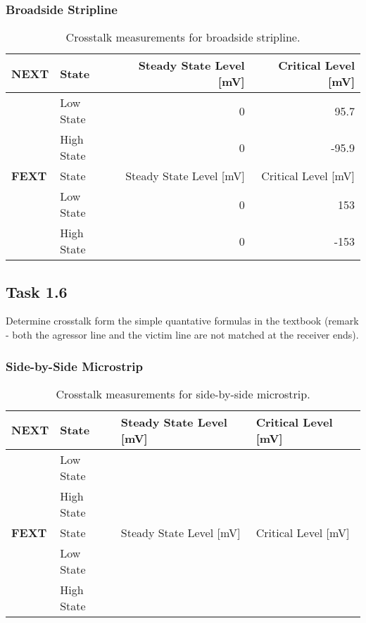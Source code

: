 \documentclass[../main.tex]{subfiles}
\begin{document}
\subsubsection{Broadside Stripline}

\begin{table}[h]
    \centering
    \begin{tabular}{l l|r r}
        \toprule[1pt]
        \textbf{NEXT} & State & Steady State Level [mV] & Critical Level [mV] \\
        \midrule
        & Low State & 0 & 95.7 \\
        & High State & 0 & -95.9 \\
        \midrule[1pt]
        \textbf{FEXT} & State & Steady State Level [mV] & Critical Level [mV] \\
        \midrule
        & Low State & 0 & 153 \\
        & High State & 0 & -153 \\
        \bottomrule[1pt]
    \end{tabular}
    \caption{Crosstalk measurements for broadside stripline.}
    \label{tab:sim-broadside-stripline}
\end{table}

\newpage

\subsection{Task 1.6}

Determine crosstalk form the simple quantative formulas in the textbook (remark - both the agressor line and the victim line are not matched at the receiver ends).

\solution

\subsubsection{Side-by-Side Microstrip}

\begin{table}[h]
    \centering
    \begin{tabular}{l l|l l}
        \toprule[1pt]
        \textbf{NEXT} & State & Steady State Level [mV] & Critical Level [mV] \\
        \midrule
        & Low State & & \\
        & High State & & \\
        \midrule[1pt]
        \textbf{FEXT} & State & Steady State Level [mV] & Critical Level [mV] \\
        \midrule
        & Low State & & \\
        & High State & & \\
        \bottomrule[1pt]
    \end{tabular}
    \caption{Crosstalk measurements for side-by-side microstrip.}
    \label{tab:calc-side-by-side-microstrip}
\end{table}
\end{document}
